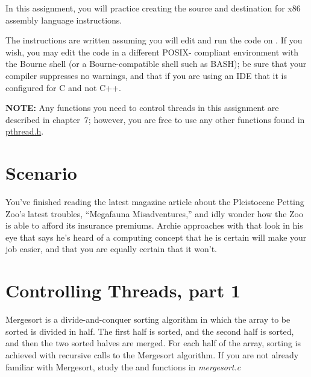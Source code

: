 

\usepackage{graphicx}

\renewcommand{\labnumber}{7}
\renewcommand{\labname}{Concurrency Lab}
\renewcommand{\shortlabname}{concurrencylab}
\renewcommand{\collaborationrules}{\individualeffort}
\renewcommand{\duedate}{Week of April 5, before the start of your lab section}
\startdocument




In this assignment, you will practice creating the source and destination for
x86 assembly language instructions.

The instructions are written assuming you will edit and run the code on
\runtimeenvironment. If you wish, you may edit the code in a different POSIX-
compliant environment with the Bourne shell (or a Bourne-compatible shell such
as BASH); be sure that your compiler suppresses no warnings, and that if you
are using an IDE that it is configured for C and not C++.

\textbf{NOTE:} Any functions you need to control threads in this assignment are
described in chapter~7; however, you are free to use any other functions found
in \href{https://pubs.opengroup.org/onlinepubs/7908799/xsh/pthread.h.html}{pthread.h}.

\section*{Scenario}

You've finished reading the latest magazine article about the Pleistocene
Petting Zoo's latest troubles, ``Megafauna Misadventures,'' and idly wonder how
the Zoo is able to afford its insurance premiums. Archie approaches with that
look in his eye that says he's heard of a computing concept that he is certain
will make your job easier, and that you are equally certain that it won't.

\section{Controlling Threads, part 1}

Mergesort is a divide-and-conquer sorting algorithm in which the array to be
sorted is divided in half. The first half is sorted, and the second half is
sorted, and then the two sorted halves are merged. For each half of the array,
sorting is achieved with recursive calls to the Mergesort algorithm. If you are
not already familiar with Mergesort, study the 
and  functions in \textit{mergesort.c}

